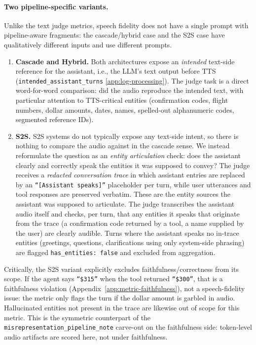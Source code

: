 \paragraph{Two pipeline-specific variants.} Unlike the text judge metrics, speech fidelity does not have a single prompt with pipeline-aware fragments: the cascade/hybrid case and the S2S case have qualitatively different inputs and use different prompts.

\begin{enumerate}
    \item \textbf{Cascade and Hybrid.} Both architectures expose an \emph{intended} text-side reference for the assistant, i.e., the LLM's text output before TTS (\texttt{intended\_assistant\_turns} \ref{app:log-processing}). The judge task is a direct word-for-word comparison: did the audio reproduce the intended text, with particular attention to TTS-critical entities (confirmation codes, flight numbers, dollar amounts, dates, names, spelled-out alphanumeric codes, segmented reference IDs).
    \item \textbf{S2S.} S2S systems do not typically expose any text-side intent, so there is nothing to compare the audio against in the cascade sense. We instead reformulate the question as an \emph{entity articulation} check: does the assistant clearly and correctly speak the entities it was supposed to convey? The judge receives a \emph{redacted conversation trace} in which assistant entries are replaced by an \texttt{``[Assistant speaks]''} placeholder per turn, while user utterances and tool responses are preserved verbatim. These are the entity sources the assistant was supposed to articulate. The judge transcribes the assistant audio itself and checks, per turn, that any entities it speaks that originate from the trace (a confirmation code returned by a tool, a name supplied by the user) are clearly audible. Turns where the assistant speaks no in-trace entities (greetings, questions, clarifications using only system-side phrasing) are flagged \texttt{has\_entities: false} and excluded from aggregation.
\end{enumerate}
Critically, the S2S variant explicitly excludes faithfulness/correctness from its scope. If the agent says \texttt{``\$315''} when the tool returned \texttt{``\$300''}, that is a faithfulness violation (Appendix~\ref{app:metric-faithfulness}), not a speech-fidelity issue: the metric only flags the turn if the dollar amount is garbled in audio. Hallucinated entities not present in the trace are likewise out of scope for this metric. This is the symmetric counterpart of the \texttt{misrepresentation\_pipeline\_note} carve-out on the faithfulness side: token-level audio artifacts are scored here, not under faithfulness.

